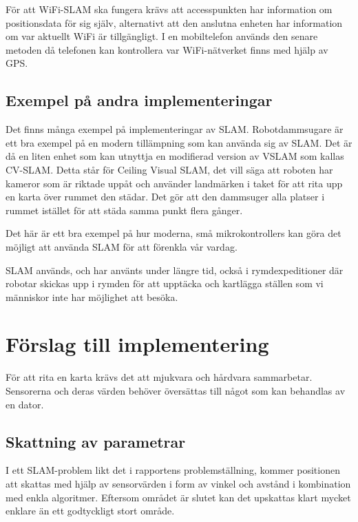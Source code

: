 \documentclass[a4paper,12pt,fleqn]{article}
\begin{document}
För att WiFi-SLAM ska fungera krävs att accesspunkten har information om positionsdata för sig själv, alternativt att den anslutna enheten har information om var aktuellt WiFi är tillgängligt. I en mobiltelefon används den senare metoden då telefonen kan kontrollera var WiFi-nätverket finns med hjälp av GPS. 

\subsection{Exempel på andra implementeringar}

Det finns många exempel på implementeringar av SLAM. Robotdammsugare är ett bra exempel på en modern tillämpning som kan använda sig av SLAM. Det är då en liten enhet som kan utnyttja en modifierad version av VSLAM som kallas CV-SLAM. Detta står för Ceiling Visual SLAM, det vill säga att roboten har kameror som är riktade uppåt och använder landmärken i taket för att rita upp en karta över rummet den städar. Det gör att den dammsuger alla platser i rummet istället för att städa samma punkt flera gånger. 

Det här är ett bra exempel på hur moderna, små mikrokontrollers kan göra det möjligt att använda SLAM för att förenkla vår vardag.

SLAM används, och har använts under längre tid, också i rymdexpeditioner där robotar skickas upp i rymden för att upptäcka och kartlägga ställen som vi människor inte har möjlighet att besöka. 

\newpage
\section{Förslag till implementering}

För att rita en karta krävs det att mjukvara och hårdvara sammarbetar. Sensorerna och deras värden behöver översättas till något som kan behandlas av en dator. 


\subsection{Skattning av parametrar}

I ett SLAM-problem likt det i rapportens problemställning, kommer positionen att skattas med hjälp av sensorvärden i form av vinkel och avstånd i kombination med enkla algoritmer. Eftersom området är slutet kan det upskattas klart mycket enklare än ett godtyckligt stort område. 
\end{document}
